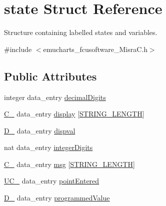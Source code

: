 \hypertarget{structstate}{}\section{state Struct Reference}
\label{structstate}


Structure containing labelled states and variables.  




{\ttfamily \#include $<$emucharts\+\_\+fcusoftware\+\_\+\+Misra\+C.\+h$>$}

\subsection*{Public Attributes}
\begin{DoxyCompactItemize}
\item 
integer data\+\_\+entry \hyperlink{structstate_ae7318648ca1bb2d6477337b86090022a}{decimal\+Digits}
\item 
\hyperlink{_android__emucharts__fcusoftware___misra_c_8h_a5a5a08d54d4f0e77b59cc0ce02bb2d47}{C\+\_} data\+\_\+entry \hyperlink{structstate_a6a18e3e28b7b18141f7c1afc1e8d36e1}{display} \mbox{[}\hyperlink{emucharts__fcusoftware___misra_c_8h_ac829415013d8120cedee928452ae0f55}{S\+T\+R\+I\+N\+G\+\_\+\+L\+E\+N\+G\+TH}\mbox{]}
\item 
\hyperlink{_android__emucharts__fcusoftware___misra_c_8h_ac134dede6b0c84e0820c0b96cbe69cb8}{D\+\_} data\+\_\+entry \hyperlink{structstate_ae8964be364b75ddef3b2c84246098b89}{dispval}
\item 
nat data\+\_\+entry \hyperlink{structstate_a267c146c9bfe2a7e0cdf36d8d50e9a7e}{integer\+Digits}
\item 
\hyperlink{_android__emucharts__fcusoftware___misra_c_8h_a5a5a08d54d4f0e77b59cc0ce02bb2d47}{C\+\_} data\+\_\+entry \hyperlink{structstate_a685a2a1db0b7be88bb2bd7ede1488b3e}{msg} \mbox{[}\hyperlink{emucharts__fcusoftware___misra_c_8h_ac829415013d8120cedee928452ae0f55}{S\+T\+R\+I\+N\+G\+\_\+\+L\+E\+N\+G\+TH}\mbox{]}
\item 
\hyperlink{_android__emucharts__fcusoftware___misra_c_8h_a39890fc8a4a6975a2740fb6b03da879d}{U\+C\+\_} data\+\_\+entry \hyperlink{structstate_a1754500336f1e552a7345dedc8d26a7e}{point\+Entered}
\item 
\hyperlink{_android__emucharts__fcusoftware___misra_c_8h_ac134dede6b0c84e0820c0b96cbe69cb8}{D\+\_} data\+\_\+entry \hyperlink{structstate_af8641ad0a4a4d007541ee08a327c76ce}{programmed\+Value}
\item 

\end{DoxyCompactItemize}
